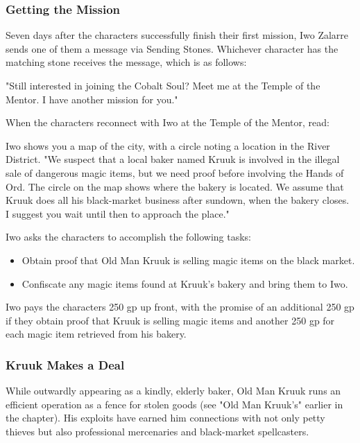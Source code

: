 \documentclass[10pt,a4paper,twoside,bg=print,twocolumn,openany,nodeprecatedcode]{dndbook}
\begin{document}
\subsubsection{Getting the Mission}
Seven days after the characters successfully finish their first mission, Iwo Zalarre sends one of them a message via Sending Stones. Whichever character has the matching stone receives the message, which is as follows:

\begin{DndReadAloud}{}
"Still interested in joining the Cobalt Soul? Meet me at the Temple of the Mentor. I have another mission for you."

\end{DndReadAloud}

When the characters reconnect with Iwo at the Temple of the Mentor, read:

\begin{DndReadAloud}{}
Iwo shows you a map of the city, with a circle noting a location in the River District. "We suspect that a local baker named Kruuk is involved in the illegal sale of dangerous magic items, but we need proof before involving the Hands of Ord. The circle on the map shows where the bakery is located. We assume that Kruuk does all his black-market business after sundown, when the bakery closes. I suggest you wait until then to approach the place."

\end{DndReadAloud}

Iwo asks the characters to accomplish the following tasks:


\begin{itemize}
\item Obtain proof that Old Man Kruuk is selling magic items on the black market.
\item Confiscate any magic items found at Kruuk's bakery and bring them to Iwo.
\end{itemize}

Iwo pays the characters 250 gp up front, with the promise of an additional 250 gp if they obtain proof that Kruuk is selling magic items and another 250 gp for each magic item retrieved from his bakery.

\subsubsection{Kruuk Makes a Deal}
While outwardly appearing as a kindly, elderly baker, Old Man Kruuk runs an efficient operation as a fence for stolen goods (see "Old Man Kruuk's" earlier in the chapter). His exploits have earned him connections with not only petty thieves but also professional mercenaries and black-market spellcasters.
\end{document}
